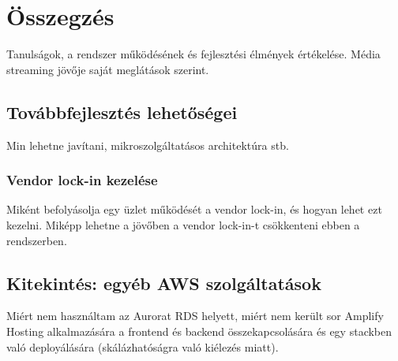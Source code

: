 \chapter{Összegzés}

Tanulságok, a rendszer működésének és fejlesztési élmények értékelése. Média streaming jövője saját meglátások szerint.

\section{Továbbfejlesztés lehetőségei}

Min lehetne javítani, mikroszolgáltatásos architektúra stb.

\subsection{Vendor lock-in kezelése}

Miként befolyásolja egy üzlet működését a vendor lock-in, és hogyan lehet ezt kezelni. Miképp lehetne a jövőben a vendor lock-in-t csökkenteni ebben a rendszerben.

\section{Kitekintés: egyéb AWS szolgáltatások}

Miért nem használtam az Aurorat RDS helyett, miért nem került sor Amplify Hosting alkalmazására a frontend és backend összekapcsolására és egy stackben való deployálására (skálázhatóságra való kiélezés miatt).
